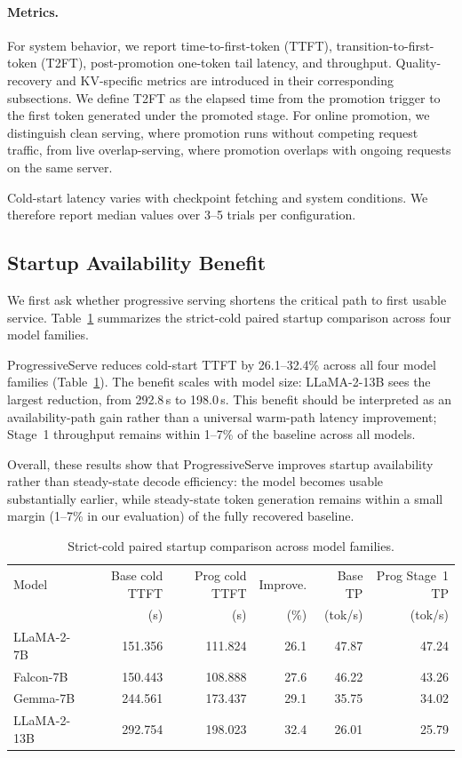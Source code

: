 \documentclass[sigplan,anonymous,review,nonacm]{acmart}
\begin{document}
\paragraph{Metrics.}
For system behavior, we report time-to-first-token (TTFT), transition-to-first-token (T2FT), post-promotion one-token tail latency, and throughput.
Quality-recovery and KV-specific metrics are introduced in their corresponding subsections.
We define T2FT as the elapsed time from the promotion trigger to the first token generated under the promoted stage.
For online promotion, we distinguish clean serving, where promotion runs without competing request traffic, from live overlap-serving, where promotion overlaps with ongoing requests on the same server.

Cold-start latency varies with checkpoint fetching and system conditions. We therefore report median values over 3--5 trials per configuration.


\subsection{Startup Availability Benefit}
\label{sec:eval-startup}
We first ask whether progressive serving shortens the critical path to first usable service. Table~\ref{tab:startup-main} summarizes the strict-cold paired startup comparison across four model families.

ProgressiveServe reduces cold-start TTFT by 26.1--32.4\% across all four model families (Table~\ref{tab:startup-main}). The benefit scales with model size: LLaMA-2-13B sees the largest reduction, from 292.8\,s to 198.0\,s. This benefit should be interpreted as an availability-path gain rather than a universal warm-path latency improvement;
Stage~1 throughput remains within 1--7\% of the baseline across all models.

Overall, these results show that ProgressiveServe improves startup availability rather than steady-state decode efficiency: the model becomes usable substantially earlier, while steady-state token generation remains within a small margin (1--7\% in our evaluation) of the fully recovered baseline.

\begin{table}[t]
\centering
\caption{Strict-cold paired startup comparison across model families.}
\label{tab:startup-main}
\small
\begin{tabular}{lrrrrr}
\toprule
Model & Base cold TTFT & Prog cold TTFT & Improve. & Base TP & Prog Stage~1 TP \\
      & (s)            & (s)            & (\%)     & (tok/s) & (tok/s) \\
\midrule
LLaMA-2-7B  & 151.356 & 111.824 & 26.1 & 47.87 & 47.24 \\
Falcon-7B   & 150.443 & 108.888 & 27.6 & 46.22 & 43.26 \\
Gemma-7B    & 244.561 & 173.437 & 29.1 & 35.75 & 34.02 \\
LLaMA-2-13B & 292.754 & 198.023 & 32.4 & 26.01 & 25.79 \\
\bottomrule
\end{tabular}
\end{table}
\end{document}
